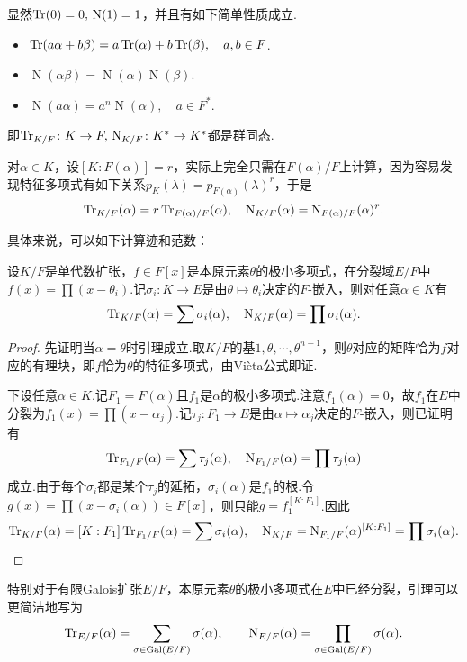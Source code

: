 显然$\operatorname{Tr}(0)=0,\,\operatorname*{N}(1)=1$，并且有如下简单性质成立.
\begin{itemize}
    \item $\operatorname{Tr}(a\alpha+b\beta)=a\operatorname{Tr}(\alpha)+b\operatorname{Tr}(\beta),\quad a,b\in F$.
    \item $\operatorname*{N}(\alpha\beta)=\operatorname*{N}(\alpha)\operatorname*{N}(\beta)$.
    \item $\operatorname*{N}(a\alpha)=a^n\operatorname*{N}(\alpha),\quad a\in F^*$.
\end{itemize}
即$\operatorname{Tr}_{K/F}\colon K\to F,\,\operatorname*{N}_{K/F}\colon K^*\to K^*$都是群同态.

对$\alpha\in K$，设$[K:F(\alpha)]=r$，实际上完全只需在$F(\alpha)/F$上计算，因为容易发现特征多项式有如下关系$p_{K}(\lambda)=p_{F(\alpha)}(\lambda)^r$，于是
\[
    \operatorname{Tr}_{K/F}(\alpha)=r\operatorname{Tr}_{F(\alpha)/F}(\alpha),\quad\operatorname{N}_{K/F}(\alpha)=\operatorname{N}_{F(\alpha)/F}(\alpha)^r.
\]

具体来说，可以如下计算迹和范数：
\begin{lemma*}
    设$K/F$是单代数扩张，$f\in F[x]$是本原元素$\theta$的极小多项式，在分裂域$E/F$中$f(x)=\prod(x-\theta_i)$.记$\sigma_i\colon K\to E$是由$\theta\mapsto\theta_i$决定的$F$-嵌入，则对任意$\alpha\in K$有
    \[
        \operatorname{Tr}_{K/F}(\alpha)=\sum\sigma_i(\alpha),\quad\operatorname{N}_{K/F}(\alpha)=\prod\sigma_i(\alpha).
    \]\vspace*{-15pt}
\end{lemma*}
\begin{proof}
    先证明当$\alpha=\theta$时引理成立.取$K/F$的基$1,\theta,\cdots,\theta^{n-1}$，则$\theta$对应的矩阵恰为$f$对应的有理块，即$f$恰为$\theta$的特征多项式，由Vi\`eta公式即证.

    下设任意$\alpha\in K$.记$F_1=F(\alpha)$且$f_1$是$\alpha$的极小多项式.注意$f_1(\alpha)=0$，故$f_1$在$E$中分裂为$f_1(x)=\prod(x-\alpha_j)$.记$\tau_j\colon F_1\to E$是由$\alpha\mapsto\alpha_j$决定的$F$-嵌入，则已证明有
    \[
        \operatorname{Tr}_{F_1/F}(\alpha)=\sum\tau_j(\alpha),\quad\operatorname{N}_{F_1/F}(\alpha)=\prod\tau_j(\alpha)
    \]
    成立.由于每个$\sigma_i$都是某个$\tau_j$的延拓，$\sigma_i(\alpha)$是$f_1$的根.令$g(x)=\prod(x-\sigma_i(\alpha))\in F[x]$，则只能$g=f_1^{[K:F_1]}$.因此
    \[
        \operatorname{Tr}_{K/F}(\alpha)=[K:F_1]\operatorname{Tr}_{F_1/F}(\alpha)=\sum\sigma_i(\alpha),\quad\operatorname{N}_{K/F}=\operatorname{N}_{F_1/F}(\alpha)^{[K:F_1]}=\prod\sigma_i(\alpha).
    \]
\end{proof}
\begin{remark}
    特别对于有限Galois扩张$E/F$，本原元素$\theta$的极小多项式在$E$中已经分裂，引理可以更简洁地写为
    \[
        \operatorname{Tr}_{E/F}(\alpha)=\sum_{\sigma\in\operatorname*{Gal}(E/F)}\sigma(\alpha),\qquad\operatorname{N}_{E/F}(\alpha)=\prod_{\sigma\in\operatorname*{Gal}(E/F)}\sigma(\alpha).
    \]
\end{remark}

